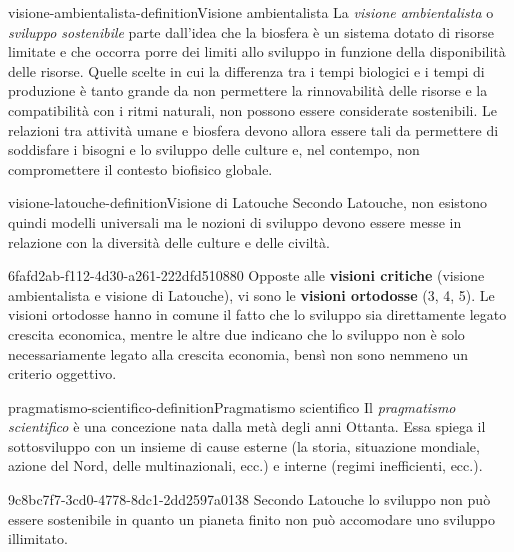 \documentclass[preview]{standalone}
\begin{document}
\begin{snippetdefinition}{visione-ambientalista-definition}{Visione ambientalista}
    La \textit{visione ambientalista} o \textit{sviluppo sostenibile}
    parte dall'idea che la biosfera è un sistema
    dotato di risorse limitate e che occorra porre dei limiti allo sviluppo in
    funzione della disponibilità delle risorse. Quelle scelte in cui la differenza tra
    i tempi biologici e i tempi di produzione è tanto grande da non permettere
    la rinnovabilità delle risorse e la compatibilità con i ritmi naturali, non
    possono essere considerate sostenibili. Le relazioni tra attività umane e
    biosfera devono allora essere tali da permettere di soddisfare i bisogni e lo
    sviluppo delle culture e, nel contempo, non compromettere il contesto
    biofisico globale.
\end{snippetdefinition}

\begin{snippetdefinition}{visione-latouche-definition}{Visione di Latouche}
    Secondo Latouche, non esistono quindi modelli universali
    ma le nozioni di sviluppo devono essere messe in relazione con la diversità
    delle culture e delle civiltà.
\end{snippetdefinition}

\begin{snippet}{6fafd2ab-f112-4d30-a261-222dfd510880}
    Opposte alle \textbf{visioni critiche} (visione ambientalista e visione di Latouche),
    vi sono le \textbf{visioni ortodosse} (3, 4, 5).
    Le visioni ortodosse hanno in comune il fatto che lo sviluppo sia direttamente legato crescita economica,
    mentre le altre due indicano che lo sviluppo non è solo necessariamente legato alla crescita economia,
    bensì non sono nemmeno un criterio oggettivo.
\end{snippet}

\begin{snippetdefinition}{pragmatismo-scientifico-definition}{Pragmatismo scientifico}
    Il \textit{pragmatismo scientifico} è una concezione nata dalla metà degli anni Ottanta.
    Essa spiega il sottosviluppo con un insieme di cause esterne (la storia, situazione mondiale, azione del Nord, delle multinazionali, ecc.)
    e interne (regimi inefficienti, ecc.).
\end{snippetdefinition}


\begin{snippet}{9c8bc7f7-3cd0-4778-8dc1-2dd2597a0138}
    Secondo Latouche lo sviluppo non può essere sostenibile in quanto
    un pianeta finito non può accomodare uno sviluppo illimitato.
\end{snippet}
\end{document}
